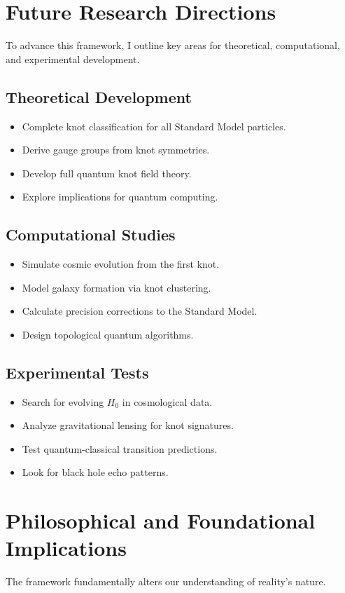 \documentclass{article}
\begin{document}
\section{Future Research Directions}
To advance this framework, I outline key areas for theoretical, computational, and experimental development.

\subsection{Theoretical Development}
\begin{itemize}
\item Complete knot classification for all Standard Model particles.
\item Derive gauge groups from knot symmetries.
\item Develop full quantum knot field theory.
\item Explore implications for quantum computing.
\end{itemize}

\subsection{Computational Studies}
\begin{itemize}
\item Simulate cosmic evolution from the first knot.
\item Model galaxy formation via knot clustering.
\item Calculate precision corrections to the Standard Model.
\item Design topological quantum algorithms.
\end{itemize}

\subsection{Experimental Tests}
\begin{itemize}
\item Search for evolving $H_0$ in cosmological data.
\item Analyze gravitational lensing for knot signatures.
\item Test quantum-classical transition predictions.
\item Look for black hole echo patterns.
\end{itemize}

\section{Philosophical and Foundational Implications}
The framework fundamentally alters our understanding of reality's nature.
\end{document}
